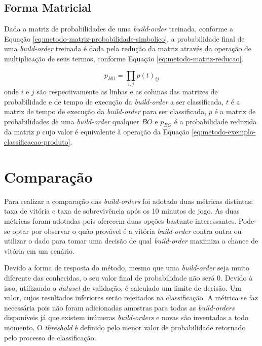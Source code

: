 			\subsection{Forma Matricial}
Dada a matriz de probabilidades de uma \textit{\gls{build-order}} treinada, conforme a Equação \ref{eq:metodo-matriz-probabilidade-simbolico}, a probabilidade final de uma \textit{\gls{build-order}} treinada é dada pela redução da matriz através da operação de multiplicação de seus termos, conforme Equação \ref{eq:metodo-matriz-reducao}.

\begin{equation}
	p_{BO} = \prod_{i,j} p(t)_{ij}
	\label{eq:metodo-matriz-reducao}
\end{equation}
\noindent onde $i$ e $j$ são respectivamente as linhas e as colunas das matrizes de probabilidade e de tempo de execução da \textit{\gls{build-order}} a ser classificada, $t$ é a matriz de tempo de execução da \textit{\gls{build-order}} para ser classificada, $p$ é a matriz de probabilidades de uma \textit{\gls{build-order}} qualquer $BO$ e $p_{BO}$ é a probabilidade reduzida da matriz $p$ cujo valor é equivalente à operação da Equação \ref{eq:metodo-exemplo-classificacao-produto}.

		\section{Comparação}
Para realizar a comparação das \textit{\glspl{build-order}} foi adotado duas métricas distintas: taxa de vitória e taxa de sobrevivência após os 10 minutos de jogo. As duas métricas foram adotadas pois oferecem duas opções bastante interessantes. Pode-se optar por observar o quão provável é a vitória \textit{\gls{build-order}} contra outra ou utilizar o dado para tomar uma decisão de qual \textit{\gls{build-order}} maximiza a chance de vitória em um cenário.

Devido a forma de resposta do método, mesmo que uma \textit{\gls{build-order}} seja muito diferente das conhecidas, o seu valor final de probabilidade não será 0. Devido à isso, utilizando o \textit{dataset} de validação, é calculado um limite de decisão. Um valor, cujos resultados inferiores serão rejeitados na classificação. A métrica se faz necessária pois não foram adicionadas amostras para todas as \textit{\glspl{build-order}} disponíveis já que existem inúmeras \textit{\glspl{build-order}} e novas são inventadas a todo momento. O \textit{threshold} é definido pelo menor valor de probabilidade retornado pelo processo de classificação.

